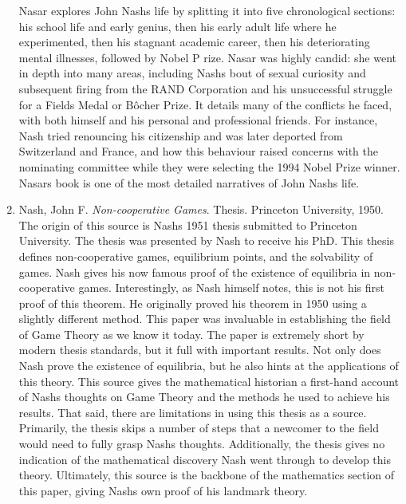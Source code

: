 \documentclass[11pt]{article}
\begin{document}
\begin{enumerate}
Nasar explores John Nash\textsc{}s life by splitting it into five chronological sections: his school life and early genius, then his early adult life where he experimented, then his stagnant academic career, then his deteriorating mental illnesses, followed by Nobel P
rize.  Nasar was highly candid: she went in depth into many areas, including Nash\textsc{}s bout of sexual curiosity and subsequent firing from the RAND Corporation and his unsuccessful struggle for a Fields Medal or Bôcher Prize. It details many of the conflicts he 
faced, with both himself and his personal and professional
 friends. For instance, Nash tried renouncing his citizenship and was later deported from Switzerland and France, and how this behaviour raised concerns with the nominating committee while they were selecting the 1994 Nobel Prize winner. Nasar\textsc{}s book is one of the most detailed narratives of John Nash\textsc{}s life.\\ 
 
\item Nash, John F. \textit{Non-cooperative Games}. Thesis. Princeton University, 1950.\\

The origin of this source is Nash\textsc{}s 1951 thesis submitted to Princeton University. The thesis was presented by Nash to receive his PhD. This thesis defines non-cooperative games, equilibrium points, and the solvability of games. Nash gives his now famous proof of the existence of equilibria in non-cooperative games. Interestingly, as Nash himself notes, this is not his first proof of this theorem. He originally proved his theorem in 1950 using a slightly different method. This paper was invaluable in establishing the field of Game Theory as we know it today. The paper is extremely short by modern thesis standards, but it full with important results. Not only does Nash prove the existence of equilibria, but he also hints at the applications of this theory. This source gives the mathematical historian a first-hand account of Nash\textsc{}s thoughts on Game Theory and the methods he used to achieve his results. That said, there are limitations in using this thesis as a source. Primarily, the thesis skips a number of steps that a newcomer to the field would need to fully grasp Nash\textsc{}s thoughts. Additionally, the thesis gives no indication of the mathematical discovery Nash went through to develop this theory. Ultimately, this source is the backbone of the mathematics section of this paper, giving Nash\textsc{}s own proof of his landmark theory.\\


\end{enumerate}
\end{document}
